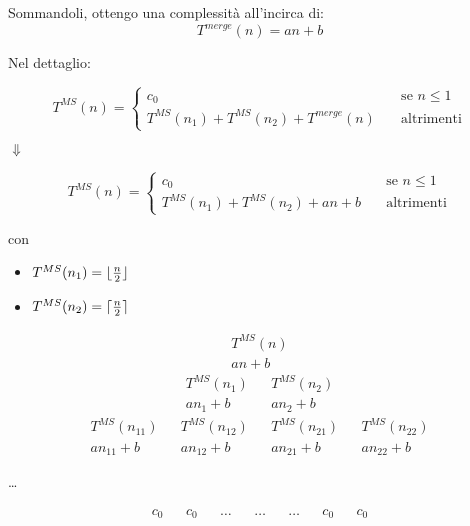 Sommandoli, ottengo una complessità all'incirca di:
\begin{displaymath}
	T^{merge}(n) = an+b
\end{displaymath}

Nel dettaglio: 

\[ T^{MS}(n) =
\begin{cases}
	c_0       & \quad \text{se } n \leq 1 \\
	T^{MS}(n_1)+T^{MS}(n_2)+T^{merge}(n)  & \quad \text{altrimenti}
\end{cases}
\]

\begin{center}
	$\Downarrow$ \\
\end{center}

\[ T^{MS}(n) =
\begin{cases}
c_0       & \quad \text{se } n \leq 1 \\
T^{MS}(n_1)+T^{MS}(n_2)+an+b  & \quad \text{altrimenti}
\end{cases}
\]

con 

\begin{itemize}
	\item[] $T^{MS}(n_1) = \lfloor\frac{n}{2}\rfloor$
	\item[] $T^{MS}(n_2) = \lceil\frac{n}{2}\rceil$
\end{itemize}


\begin{align*}
	T^{MS}(n) \\
	an+b
\end{align*}
\begin{align*}
	T^{MS}(n_1) && T^{MS}(n_2) \\
	an_1+b && an_2+b
\end{align*}
\begin{align*}
T^{MS}(n_{11}) && T^{MS}(n_{12}) && T^{MS}(n_{21}) && T^{MS}(n_{22}) \\
an_{11}+b && an_{12}+b && an_{21}+b && an_{22}+b
\end{align*}
\begin{center}
	\dots
\end{center}
\begin{align*}
	c_0 && c_0 && \dots && \dots && \dots && c_0 && c_0 \\
\end{align*}

